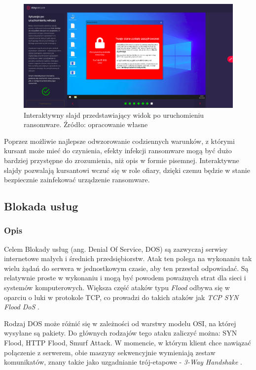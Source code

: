 \documentclass[12pt,twoside]{article}
\begin{document}
\begin{figure}[H]
	\centering
	\includegraphics[width=0.98\linewidth]{figures/ransomware-slide-screenshot4}
	\caption{Interaktywny slajd przedstawiający widok po uruchomieniu ransomware. Źródło: opracowanie własne}
\end{figure}

Poprzez możliwie najlepsze odwzorowanie codziennych warunków, z którymi kursant może mieć do czynienia, efekty infekcji ransomware mogą być dużo bardziej przystępne do zrozumienia, niż opis w formie pisemnej. Interaktywne slajdy pozwalają kursantowi wczuć się w role ofiary, dzięki czemu będzie w stanie bezpiecznie zainfekować urządzenie ransomware. 

\clearpage
\subsection{Blokada usług}
\subsubsection{Opis}
Celem Blokady usług (ang. Denial Of Service, DOS) są zazwyczaj serwisy internetowe małych i średnich przedsiębiorstw. Atak ten polega na wykonaniu tak wielu żądań do serwera w jednostkowym czasie, aby ten przestał odpowiadać. Są relatywnie proste w wykonaniu i mogą być powodem poważnych strat dla sieci i systemów komputerowych. Większa część ataków typu \emph{Flood} odbywa się w oparciu o luki w protokole TCP, co prowadzi do takich ataków jak \emph{TCP SYN Flood DoS} \cite{Ddos}.

Rodzaj DOS może różnić się w zależności od warstwy modelu OSI, na której wysyłane są pakiety. Do głównych rodzajów tego ataku zaliczyć można: SYN Flood, HTTP Flood, Smurf Attack. W momencie, w którym klient chce nawiązać połączenie z serwerem, obie maszyny sekwencyjnie wymieniają zestaw komunikatów, znany także jako uzgadnianie trój-etapowe - \emph{3-Way Handshake} \cite{3WayHandshake}. 
\end{document}
